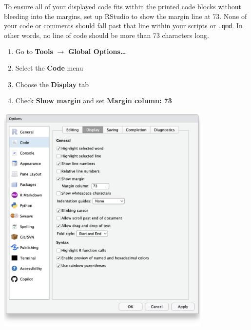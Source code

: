 \documentclass[
  11pt,
  letterpaper,
  twoside]{report}
\providecommand{\tightlist}{%
  \setlength{\itemsep}{0pt}\setlength{\parskip}{0pt}}\usepackage{longtable,booktabs,array}
\begin{document}
\begin{enumerate}
\begin{tcolorbox}
  \end{tcolorbox}

  \newpage{}

  \begin{tcolorbox}[enhanced jigsaw, coltitle=black, leftrule=.75mm, rightrule=.15mm, breakable, titlerule=0mm, bottomrule=.15mm, left=2mm, colbacktitle=quarto-callout-caution-color!10!white, arc=.35mm, toprule=.15mm, title=\textcolor{quarto-callout-caution-color}{\faFire}\hspace{0.5em}{Caution}, toptitle=1mm, colback=white, bottomtitle=1mm, opacitybacktitle=0.6, opacityback=0, colframe=quarto-callout-caution-color-frame]

  To ensure all of your displayed code fits within the printed code
  blocks without bleeding into the margins, set up RStudio to show the
  margin line at 73. None of your code or comments should fall past that
  line within your scripts or \texttt{.qmd}. In other words, no line of
  code should be more than 73 characters long.

  \begin{enumerate}
  \def\labelenumii{\arabic{enumii}.}
  \tightlist
  \item
    Go to \textbf{Tools} \(\rightarrow\) \textbf{Global Options\ldots{}}
  \item
    Select the \textbf{Code} menu
  \item
    Choose the \textbf{Display} tab
  \item
    Check \textbf{Show margin} and set \textbf{Margin column: 73}
  \end{enumerate}

  \begin{center}
  \includegraphics[width=0.8\textwidth,height=\textheight]{fig/temp_show-margin.png}
  \end{center}

  \end{tcolorbox}
\end{enumerate}
\end{document}
